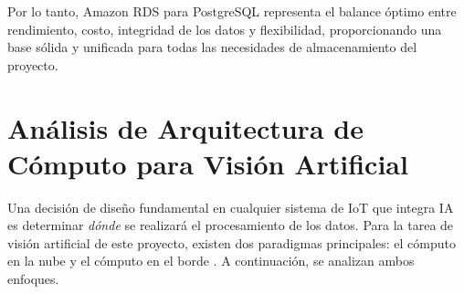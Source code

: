 Por lo tanto, Amazon RDS para PostgreSQL representa el balance óptimo entre rendimiento, costo, integridad de los datos y flexibilidad, proporcionando una base sólida y unificada para todas las necesidades de almacenamiento del proyecto.



\section{Análisis de Arquitectura de Cómputo para Visión Artificial}
\label{sec:analisis_edge_vs_cloud}

Una decisión de diseño fundamental en cualquier sistema de IoT que integra IA es determinar \textit{dónde} se realizará el procesamiento de los datos. Para la tarea de visión artificial de este proyecto, existen dos paradigmas principales: el cómputo en la nube y el cómputo en el borde \cite{shi2016edge}. A continuación, se analizan ambos enfoques.

